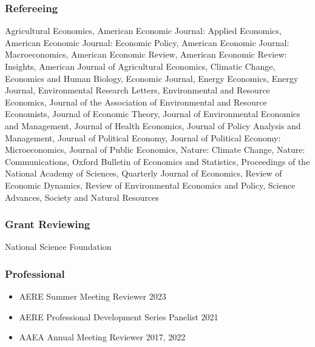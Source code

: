 \documentclass[12pt]{res} %
\begin{document}
\begin{resume}
\subsubsection{Refereeing}\vspace{-.2in}
	Agricultural Economics,
	American Economic Journal: Applied Economics,
	American Economic Journal: Economic Policy,
	American Economic Journal: Macroeconomics,
	American Economic Review,
	American Economic Review: Insights,
	American Journal of Agricultural Economics,
	Climatic Change,
	Economics and Human Biology,
	Economic Journal,
	Energy Economics,
	Energy Journal,
	Environmental Research Letters,
	Environmental and Resource Economics,
	Journal of the Association of Environmental and Resource Economists,
	Journal of Economic Theory,
	Journal of Environmental Economics and Management,
	Journal of Health Economics,
	Journal of Policy Analysis and Management,
	Journal of Political Economy,
	Journal of Political Economy: Microeconomics,
	Journal of Public Economics,
	Nature: Climate Change,
	Nature: Communications,
	Oxford Bulletin of Economics and Statistics,
	Proceedings of the National Academy of Sciences,
	Quarterly Journal of Economics,
	Review of Economic Dynamics,
	Review of Environmental Economics and Policy,
	Science Advances,
	Society and Natural Resources

\vspace{-.2in}

\subsubsection{Grant Reviewing} 

\vspace{-.2in}

National Science Foundation

\vspace{-.2in}


\subsubsection{Professional}
\begin{itemize} \itemsep -1pt
	\item[] AERE Summer Meeting Reviewer \hfill 2023
	\item[]	AERE Professional Development Series Panelist \hfill 2021
	\item[] AAEA Annual Meeting Reviewer \hfill 2017, 2022
\end{itemize}



\end{resume}
\end{document}
